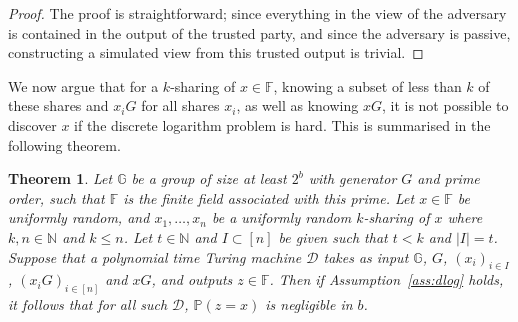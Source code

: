 \documentclass{article}
\newcommand{\seq}[1]{\left[#1\right]}
\newtheorem{theorem}{Theorem}
\theoremstyle{remark}
\newcommand{\N}{\mathbb{N}}
\newcommand{\F}{\mathbb{F}}
\newcommand{\G}{\mathbb{G}}
\renewcommand{\P}{\mathbb{P}}
\begin{document}
\begin{proof}
	The proof is straightforward; since everything in the view of the adversary
	is contained in the output of the trusted party, and since the adversary is
	passive, constructing a simulated view from this trusted output is trivial.
\end{proof}

We now argue that for a $k$-sharing of $x \in \F$, knowing a subset of less
than $k$ of these shares and $x_i G$ for all shares $x_i$, as well as knowing
$xG$, it is not possible to discover $x$ if the discrete logarithm problem is
hard. This is summarised in the following theorem.

\begin{theorem}
	Let $\G$ be a group of size at least $2^b$ with generator $G$ and prime
	order, such that $\F$ is the finite field associated with this prime. Let
	$x \in \F$ be uniformly random, and $x_1, \ldots, x_n$ be a uniformly
	random $k$-sharing of $x$ where $k, n \in \N$ and $k \le n$. Let $t \in \N$
	and $I \subset \seq{n}$ be given such that $t < k $ and $|I| = t$. Suppose
	that a polynomial time Turing machine $\mathcal{D}$ takes as input $\G$,
	$G$, ${(x_i)}_{i \in I}$, ${(x_i G)}_{i \in \seq{n}}$ and $xG$, and outputs
	$z \in \F$. Then if Assumption~\ref{ass:dlog} holds, it follows that for
	all such $\mathcal{D}$, $\P(z = x)$ is negligible in $b$.
\end{theorem}
\end{document}
